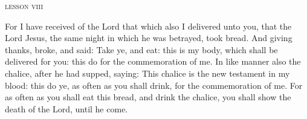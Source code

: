 \mylessonsize
\begin{center}{\textsc{lesson viii}}\end{center}
{For I have received of the Lord that which also I delivered unto you, that the Lord Jesus, the same night in which he was betrayed, took bread.
And giving thanks, broke, and said: Take ye, and eat: this is my body, which shall be delivered for you: this do for the commemoration of me.
In like manner also the chalice, after he had supped, saying: This chalice is the new testament in my blood: this do ye, as often as you shall drink, for the commemoration of me.
For as often as you shall eat this bread, and drink the chalice, you shall show the death of the Lord, until he come.}

\bigskip\bigskip
\pagebreak

